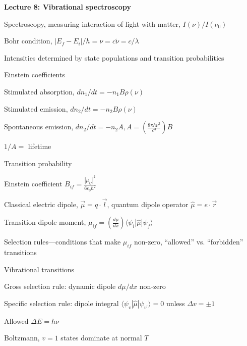 \documentclass[11pt]{article}
\begin{document}
\begin{outline}
\item{{\bf Lecture 8: Vibrational spectroscopy}}
  \begin{outline}
    \item Spectroscopy, measuring interaction of light with matter, $I(\nu)/I(\nu_0)$
    \item Bohr condition, $|E_f-E_i|/h=\nu =c\tilde{\nu}=c/\lambda$
    \item Intensities determined by state populations and transition probabilities
    \item Einstein coefficients
      \begin{outline}
        \item Stimulated absorption, $dn_1/dt= -n_1 B\rho(\nu)$
        \item Stimulated emission, $dn_2/dt= -n_2 B\rho(\nu)$
        \item Spontaneous emission, $dn_2/dt=-n_2 A, A=\left ( \frac{8\pi h
              \nu^3}{c^3}\right )B$
        \item $1/A=$ lifetime
      \end{outline}

    \item Transition probability
      \begin{outline}
        \item Einstein coefficient $B_{if}=\frac{|\mu_{if}|^2}{6\epsilon_0\hbar^2}$
        \item Classical electric dipole, $\overrightarrow{\mu}=q \cdot
          \overrightarrow{l}$, quantum dipole operator $\hat\mu = e\cdot \overrightarrow{r}$
        \item Transition dipole moment, $\mu_{if} = \left(
        \frac{d\mu}{dx}\right ) \langle \psi_i|\hat\mu |\psi_f \rangle $
    \item Selection rules---conditions that make $\mu_{if}$ non-zero,
      ``allowed'' vs. ``forbidden'' transitions
      \end{outline}

    \item Vibrational transitions
      \begin{outline}
        \item Gross selection rule: dynamic dipole $d\mu/dx$ non-zero
        \item Specific selection rule: dipole integral $\langle \psi_v|\hat\mu|\psi_{v^\prime} \rangle =0$
          unless $\Delta v = \pm 1$
        \item Allowed $\Delta E = h\nu$
        \item Boltzmann, $v=1$ states dominate at normal $T$
      \end{outline}


\end{outline}
\end{outline}
\end{document}
